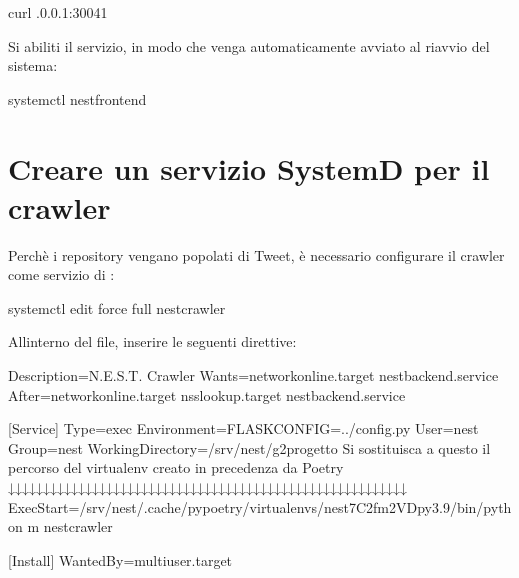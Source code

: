 \documentclass[letterpaper,10pt,italian]{sphinxmanual}
\begin{document}
\begin{sphinxVerbatim}[commandchars=\\\{\}]
curl .0.0.1:30041
\end{sphinxVerbatim}

\sphinxAtStartPar
Si abiliti il servizio, in modo che venga automaticamente avviato al riavvio del sistema:

\begin{sphinxVerbatim}[commandchars=\\\{\}]
systemctl  nest\PYGZhy{}frontend
\end{sphinxVerbatim}


\section{Creare un servizio SystemD per il crawler}
\label{\detokenize{guide/installation:creare-un-servizio-systemd-per-il-crawler}}
\sphinxAtStartPar
Perchè i repository vengano popolati di Tweet, è necessario configurare il crawler come servizio di :

\begin{sphinxVerbatim}[commandchars=\\\{\}]
systemctl edit \PYGZhy{}\PYGZhy{}force \PYGZhy{}\PYGZhy{}full nest\PYGZhy{}crawler
\end{sphinxVerbatim}

\sphinxAtStartPar
All\textquotesingle{}interno del file, inserire le seguenti direttive:

\begin{sphinxVerbatim}[commandchars=\\\{\}]
[Unit]
Description=N.E.S.T. Crawler
Wants=network\PYGZhy{}online.target nest\PYGZhy{}backend.service
After=network\PYGZhy{}online.target nss\PYGZhy{}lookup.target nest\PYGZhy{}backend.service

[Service]
Type=exec
Environment=FLASK\PYGZus{}CONFIG=../config.py
User=nest
Group=nest
WorkingDirectory=/srv/nest/g2\PYGZhy{}progetto
\PYGZsh{} Si sostituisca a questo il percorso del virtualenv creato in precedenza da Poetry
\PYGZsh{}         ↓↓↓↓↓↓↓↓↓↓↓↓↓↓↓↓↓↓↓↓↓↓↓↓↓↓↓↓↓↓↓↓↓↓↓↓↓↓↓↓↓↓↓↓↓↓↓↓↓↓↓↓↓↓↓↓↓
ExecStart=/srv/nest/.cache/pypoetry/virtualenvs/nest\PYGZhy{}7C2fm2VD\PYGZhy{}py3.9/bin/python \PYGZhy{}m nest\PYGZus{}crawler

[Install]
WantedBy=multi\PYGZhy{}user.target
\end{sphinxVerbatim}
\end{document}
